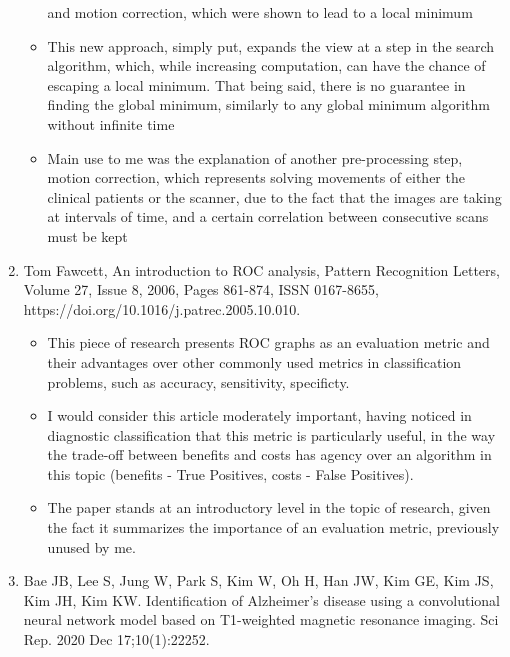 \documentclass[a4paper]{article}
\begin{document}
\begin{enumerate}
\begin{itemize}
                        and motion correction, which were shown to lead to a local minimum
                  \item This new approach, simply put, expands the view at a step in the search algorithm, which, while increasing
                        computation, can have the chance of escaping a local minimum. That being said, there is no guarantee in finding
                        the global minimum, similarly to any global minimum algorithm without infinite time
                  \item Main use to me was the explanation of another pre-processing step, motion correction, which represents solving movements
                        of either the clinical patients or the scanner, due to the fact that the images are taking at intervals of time, and a
                        certain correlation between consecutive scans must be kept
            \end{itemize}
      \item Tom Fawcett, An introduction to ROC analysis, Pattern Recognition Letters, Volume 27, Issue 8, 2006, Pages 861-874,
            ISSN 0167-8655, \\
            https://doi.org/10.1016/j.patrec.2005.10.010.
            \begin{itemize}
                  \item This piece of research presents ROC graphs as an evaluation metric and their advantages over other commonly
                        used metrics in classification problems, such as accuracy, sensitivity, specificty.
                  \item I would consider this article moderately important, having noticed in diagnostic classification that this
                        metric is particularly useful, in the way the trade-off between benefits and costs has agency over an
                        algorithm in this topic (benefits - True Positives, costs - False Positives).
                  \item The paper stands at an introductory level in the topic of research, given the fact it summarizes the importance
                        of an evaluation metric, previously unused by me.
            \end{itemize}
      \item Bae JB, Lee S, Jung W, Park S, Kim W, Oh H, Han JW, Kim GE, Kim JS, Kim JH, Kim KW. Identification of Alzheimer's disease
            using a convolutional neural network model based on T1-weighted magnetic resonance imaging. Sci Rep. 2020 Dec 17;10(1):22252.

\end{enumerate}
\end{document}
